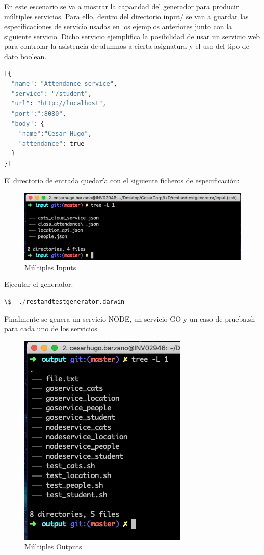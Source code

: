 \documentclass[a4paper,11pt]{book}
\begin{document}
En este escenario se va a mostrar la capacidad del generador para producir múltiples servicios. Para ello, dentro del directorio input/ se van a guardar las especificaciones de servicio usadas en los ejemplos anteriores junto con la siguiente servicio. Dicho servicio ejemplifica la posibilidad de usar un servicio web para controlar la asistencia de alumnos a cierta asignatura y el uso del tipo de dato boolean. 

\begin{lstlisting}[language=python,caption={  Ejemplo definición servicio class\_attendance.json}]
[{
  "name": "Attendance service",
  "service": "/student",
  "url": "http://localhost",
  "port":":8080",
  "body": {
    "name":"Cesar Hugo",
    "attendance": true
  }
}]
\end{lstlisting} 

El directorio de entrada quedaría con el siguiente ficheros de especificación: 

\begin{figure}[H]  
\centering 
\includegraphics[scale=0.25]{imagenes/t41.png}
\caption{ Múltiples Inputs}  
\end{figure}

Ejecutar el generador: 

\begin{lstlisting}[language=python,caption={ Ejemplo Ejecución Generador: múltiples inputs  }]
\$  ./restandtestgenerator.darwin 
\end{lstlisting} 

Finalmente se genera un servicio NODE, un servicio GO y un caso de prueba.sh para cada uno de los servicios. 

\begin{figure}[H]  
\centering 
\includegraphics[scale=0.25]{imagenes/t42.png}
\caption{ Múltiples Outputs}  
\end{figure}
\end{document}
